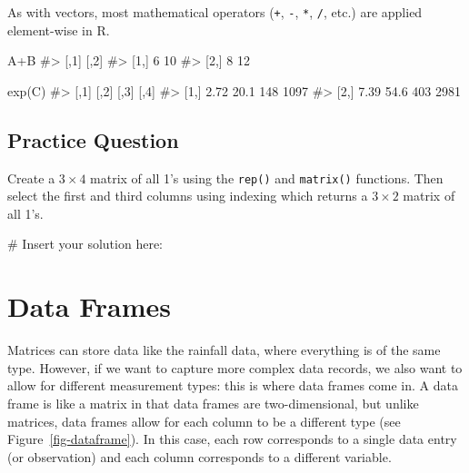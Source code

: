 \documentclass[
  letterpaper,
]{latex/krantz}
\makeatletter
\newenvironment{Shaded}{\begin{snugshade}}{\end{snugshade}}
\newcommand{\CommentTok}[1]{\textcolor[rgb]{0.37,0.37,0.37}{#1}}
\newcommand{\FunctionTok}[1]{\textcolor[rgb]{0.28,0.35,0.67}{#1}}
\newcommand{\NormalTok}[1]{\textcolor[rgb]{0.00,0.23,0.31}{#1}}
\newcommand{\SpecialCharTok}[1]{\textcolor[rgb]{0.37,0.37,0.37}{#1}}
\newenvironment{kframe}{%
\medskip{}
\setlength{\fboxsep}{.8em}
 \def\at@end@of@kframe{}%
 \ifinner\ifhmode%
  \def\at@end@of@kframe{\end{minipage}}%
  \begin{minipage}{\columnwidth}%
 \fi\fi%
 \def\FrameCommand##1{\hskip\@totalleftmargin \hskip-\fboxsep
 \colorbox{shadecolor}{##1}\hskip-\fboxsep
     \hskip-\linewidth \hskip-\@totalleftmargin \hskip\columnwidth}%
 \MakeFramed {\advance\hsize-\width
   \@totalleftmargin\z@ \linewidth\hsize
   \@setminipage}}%
 {\par\unskip\endMakeFramed%
 \at@end@of@kframe}
\renewenvironment{Shaded}{\begin{kframe}}{\end{kframe}}
\makeatother
\begin{document}
As with vectors, most mathematical operators (\texttt{+}, \texttt{-},
\texttt{*}, \texttt{/}, etc.) are applied element-wise in R.

\begin{Shaded}
\begin{Highlighting}[]
\NormalTok{A}\SpecialCharTok{+}\NormalTok{B}
\CommentTok{\#\textgreater{}      [,1] [,2]}
\CommentTok{\#\textgreater{} [1,]    6   10}
\CommentTok{\#\textgreater{} [2,]    8   12}
\end{Highlighting}
\end{Shaded}

\begin{Shaded}
\begin{Highlighting}[]
\FunctionTok{exp}\NormalTok{(C)}
\CommentTok{\#\textgreater{}      [,1] [,2] [,3] [,4]}
\CommentTok{\#\textgreater{} [1,] 2.72 20.1  148 1097}
\CommentTok{\#\textgreater{} [2,] 7.39 54.6  403 2981}
\end{Highlighting}
\end{Shaded}

\subsection{Practice Question}\label{practice-question-1}

Create a \(3 \times 4\) matrix of all 1's using the \texttt{rep()} and
\texttt{matrix()} functions. Then select the first and third columns
using indexing which returns a \(3 \times 2\) matrix of all 1's.

\begin{Shaded}
\begin{Highlighting}[]
\CommentTok{\# Insert your solution here:}
\end{Highlighting}
\end{Shaded}

\section{\texorpdfstring{Data Frames
}{Data Frames }}\label{data-frames}

Matrices can store data like the rainfall data, where everything is of
the same type. However, if we want to capture more complex data records,
we also want to allow for different measurement types: this is where
data frames come in. A data frame is like a matrix in that data frames
are two-dimensional, but unlike matrices, data frames allow for each
column to be a different type (see Figure~\ref{fig-dataframe}). In this
case, each row corresponds to a single data entry (or observation) and
each column corresponds to a different variable.
\end{document}
